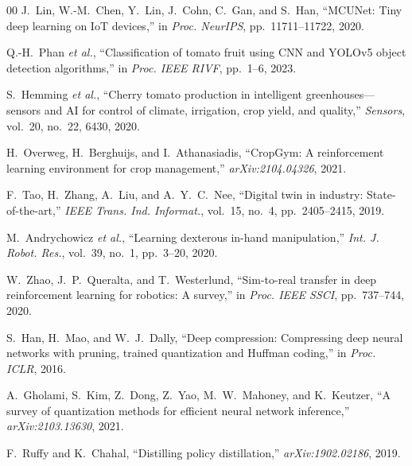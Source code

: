 \documentclass[conference]{IEEEtran}
\begin{document}
\begin{thebibliography}{00}
    J.~Lin, W.-M.~Chen, Y.~Lin, J.~Cohn, C.~Gan, and S.~Han, ``MCUNet: Tiny deep learning on IoT devices,'' in \textit{Proc. NeurIPS}, pp.~11711--11722, 2020.

    Q.-H.~Phan \textit{et al.}, ``Classification of tomato fruit using CNN and YOLOv5 object detection algorithms,'' in \textit{Proc. IEEE RIVF}, pp.~1--6, 2023.

    S.~Hemming \textit{et al.}, ``Cherry tomato production in intelligent greenhouses---sensors and AI for control of climate, irrigation, crop yield, and quality,'' \textit{Sensors}, vol.~20, no.~22, 6430, 2020.

    H.~Overweg, H.~Berghuijs, and I.~Athanasiadis, ``CropGym: A reinforcement learning environment for crop management,'' \textit{arXiv:2104.04326}, 2021.

    F.~Tao, H.~Zhang, A.~Liu, and A.~Y.~C.~Nee, ``Digital twin in industry: State-of-the-art,'' \textit{IEEE Trans. Ind. Informat.}, vol.~15, no.~4, pp.~2405--2415, 2019.

    M.~Andrychowicz \textit{et al.}, ``Learning dexterous in-hand manipulation,'' \textit{Int. J. Robot. Res.}, vol.~39, no.~1, pp.~3--20, 2020.

    W.~Zhao, J.~P.~Queralta, and T.~Westerlund, ``Sim-to-real transfer in deep reinforcement learning for robotics: A survey,'' in \textit{Proc. IEEE SSCI}, pp.~737--744, 2020.

    S.~Han, H.~Mao, and W.~J.~Dally, ``Deep compression: Compressing deep neural networks with pruning, trained quantization and Huffman coding,'' in \textit{Proc. ICLR}, 2016.

    A.~Gholami, S.~Kim, Z.~Dong, Z.~Yao, M.~W.~Mahoney, and K.~Keutzer, ``A survey of quantization methods for efficient neural network inference,'' \textit{arXiv:2103.13630}, 2021.

    F.~Ruffy and K.~Chahal, ``Distilling policy distillation,'' \textit{arXiv:1902.02186}, 2019.

    \end{thebibliography}

    
\end{document}
